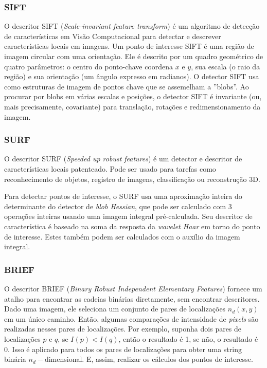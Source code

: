 \documentclass[twoside,twocolumn]{article}
\begin{document}
\subsubsection{SIFT}

O descritor SIFT (\textit{Scale-invariant feature transform}) é um algoritmo de detecção de características em Visão Computacional para detectar e descrever características locais em imagens. Um ponto de interesse SIFT é uma região de imagem circular com uma orientação. Ele é descrito por um quadro geométrico de quatro parâmetros: o centro do ponto-chave coordena $x$ e $y$, sua escala (o raio da região) e sua orientação (um ângulo expresso em radianos). O detector SIFT usa como estruturas de imagem de pontos chave que se assemelham a ''blobs''. Ao procurar por blobs em várias escalas e posições, o detector SIFT é invariante (ou, mais precisamente, covariante) para translação, rotações e redimensionamento da imagem.

\subsubsection{SURF}

O descritor SURF (\textit{Speeded up robust features}) é um detector e descritor de características locais patenteado. Pode ser usado para tarefas como reconhecimento de objetos, registro de imagens, classificação ou reconstrução 3D.

Para detectar pontos de interesse, o SURF usa uma aproximação inteira do determinante do detector de \textit{blob Hessian}, que pode ser calculado com 3 operações inteiras usando uma imagem integral pré-calculada. Seu descritor de característica é baseado na soma da resposta da \textit{wavelet Haar} em torno do ponto de interesse. Estes também podem ser calculados com o auxílio da imagem integral.

\subsubsection{BRIEF}

O descritor BRIEF (\textit{Binary Robust Independent Elementary Features}) fornece um atalho para encontrar as cadeias binárias diretamente, sem encontrar descritores. Dado uma imagem, ele seleciona um conjunto de pares de localizações $n_{d}(x,y)$ em um único caminho. Então, algumas comparações de intensidade de \textit{pixels} são realizadas nesses pares de localizações. Por exemplo, suponha dois pares de localizações $p$ e $q$, se $I(p) < I(q)$, então o resultado é 1, se não, o resultado é 0. Isso é aplicado para todos os pares de localizações para obter uma string binária $n_{d}-$dimensional. E, assim, realizar os cálculos dos pontos de interesse.
\end{document}
